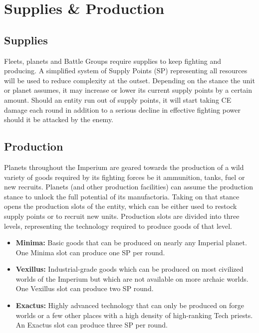 \chapter{Supplies \& Production}
\section{Supplies}
Fleets, planets and Battle Groups require supplies to keep fighting and producing. 
A simplified system of Supply Points (SP) representing all resources will be used to reduce complexity at the outset.
Depending on the stance the unit or planet assumes, it may increase or lower its current supply points by a certain amount.
Should an entity run out of supply points, it will start taking CE damage each round in addition to a serious decline in effective fighting power should it be attacked by the enemy.


\section{Production}
Planets throughout the Imperium are geared towards the production of a wild variety of goods required by its fighting forces be it ammunition, tanks, fuel or new recruits.
Planets (and other production facilities) can assume the production stance to unlock the full potential of its manufactoria.
Taking on that stance opens the production slots of the entity, which can be either used to restock supply points or to recruit new units.
Production slots are divided into three levels, representing the technology required to produce goods of that level.
\begin{itemize}
	\item \textbf{Minima:} Basic goods that can be produced on nearly any Imperial planet. One Minima slot can produce one SP per round.
	\item \textbf{Vexillus:} Industrial-grade goods which can be produced on most civilized worlds of the Imperium but which are not available on more archaic worlds.	One Vexillus slot can produce two SP round.
	\item \textbf{Exactus:} Highly advanced technology that can only be produced on forge worlds or a few other places with a high density of high-ranking Tech priests. An Exactus slot can produce three SP per round.
\end{itemize}

